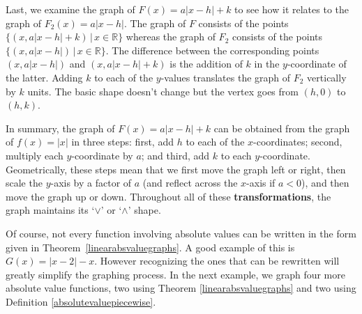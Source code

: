 \documentclass{ximera}
\begin{document}
\medskip

Last, we examine the graph of $F(x) = a|x - h| + k$ to see how it relates to the graph of $F_{2}(x) = a|x - h|$.  The graph of $F$ consists of the points $\{ (x, a|x - h| + k ) \, | \, x \in \mathbb{R} \}$ whereas the graph of $F_{2}$ consists of the points $\{ (x, a|x - h|) \, | \, x \in \mathbb{R} \}$.  The difference between the corresponding points $(x, a|x - h|)$ and $(x, a|x - h| + k )$ is the addition of $k$ in the $y$-coordinate of the latter.  Adding $k$ to each of the $y$-values translates the graph of $F_{2}$ vertically by $k$ units.  The basic shape doesn't change but the vertex goes from $(h, 0)$ to $(h, k)$.

\medskip

In summary, the graph of $F(x) = a|x - h| + k$ can be obtained from the graph of $f(x) = |x|$ in three steps:  first, add $h$ to each of the $x$-coordinates;  second, multiply each $y$-coordinate by $a$; and third, add $k$ to each $y$-coordinate.  Geometrically, these steps mean that we first move the graph left or right, then scale the $y$-axis by a factor of $a$ (and reflect across the $x$-axis if $a < 0$), and then move the graph up or down.  Throughout all of these \textbf{transformations}, the graph maintains its `$\vee$' or `$\wedge$' shape.

\medskip

Of course, not every function involving absolute values can be written in the form given in Theorem~\ref{linearabsvaluegraphs}. A good example of this is $G(x) = |x - 2| - x$.  However recognizing the ones that can be rewritten will greatly simplify the graphing process. In the next example, we graph four more absolute value functions, two using Theorem \ref{linearabsvaluegraphs} and two using Definition \ref{absolutevaluepiecewise}.

\enlargethispage{.05in}
\end{document}
